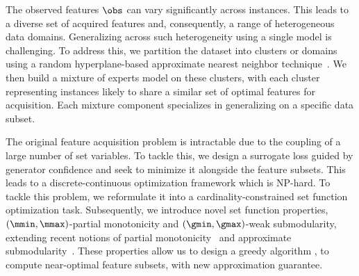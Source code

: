 \documentclass[letterpaper]{article}
\renewcommand{\cite}{\citep}
\begin{document}
The observed features $\obs$ can vary significantly across instances.  This leads to a diverse set of acquired features and, consequently, a range of heterogeneous data domains. Generalizing across such heterogeneity using a single model is challenging.
To address this, we partition the dataset into clusters or domains using a random hyperplane-based approximate nearest neighbor technique~\cite{indyk1999approximate}. We then build a mixture of experts model on these clusters, with each cluster representing instances likely to share a similar set of optimal features for acquisition. Each mixture component specializes in generalizing on a specific data subset.







The original feature acquisition problem is intractable due to the coupling of a large number of set variables. To tackle this, we design a surrogate loss guided by generator confidence and seek to minimize it alongside the feature subsets. This leads to a discrete-continuous optimization framework which is NP-hard. To tackle this problem, we reformulate it into a cardinality-constrained set function optimization task. Subsequently, we  introduce novel set function properties, $(\mmin,\mmax)$-partial monotonicity and $(\gmin,\gmax)$-weak submodularity, extending recent notions of partial monotonicity~\cite{mualem2022using} and  approximate submodularity~\cite{elenberg2018restricted,harshaw2019submodular,cuha}. These properties allow us to design a greedy algorithm \our, to compute near-optimal feature subsets, with new approximation guarantee.
\end{document}
